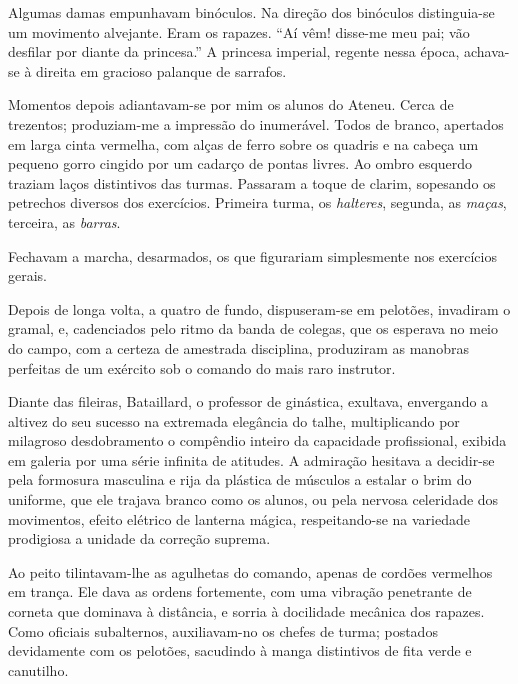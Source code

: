 Algumas damas empunhavam binóculos. Na direção dos binóculos
distinguia{}-se um movimento alvejante. Eram os rapazes. ``Aí vêm!
disse{}-me meu pai; vão desfilar por diante da princesa.'' A princesa
imperial, regente nessa época, achava{}-se à direita em gracioso
palanque de sarrafos. 

Momentos depois adiantavam{}-se por mim os alunos
do Ateneu. Cerca de trezentos; produziam{}-me a impressão do
inumerável. Todos de branco, apertados em larga cinta vermelha, com
alças de ferro sobre os quadris e na cabeça um pequeno gorro cingido
por um cadarço de pontas livres. Ao ombro esquerdo traziam laços
distintivos das turmas. Passaram a toque de clarim, sopesando os
petrechos diversos dos exercícios. Primeira turma, os \textit{halteres},
segunda, as \textit{maças}, terceira, as \textit{barras}. 

Fechavam a marcha, desarmados,
os que figurariam simplesmente nos exercícios gerais. 

Depois de longa volta, a quatro de fundo, dispuseram{}-se em pelotões, invadiram o
gramal, e, cadenciados pelo ritmo da banda de colegas, que os esperava
no meio do campo, com a certeza de amestrada disciplina, produziram as
manobras perfeitas de um exército sob o comando do mais raro instrutor.

Diante das fileiras, Bataillard, o professor de ginástica, exultava,
envergando a altivez do seu sucesso na extremada elegância do talhe,
multiplicando por milagroso desdobramento o compêndio inteiro da
capacidade profissional, exibida em galeria por uma série infinita de
atitudes. A admiração hesitava a decidir{}-se pela formosura masculina
e rija da plástica de músculos a estalar o brim do uniforme, que ele
trajava branco como os alunos, ou pela nervosa celeridade dos
movimentos, efeito elétrico de lanterna mágica, respeitando{}-se na
variedade prodigiosa a unidade da correção suprema. 

Ao peito tilintavam{}-lhe as agulhetas do comando, apenas de cordões vermelhos
em trança. Ele dava as ordens fortemente, com uma vibração penetrante
de corneta que dominava à distância, e sorria à docilidade mecânica dos
rapazes. Como oficiais subalternos, auxiliavam{}-no os chefes de turma;
postados devidamente com os pelotões, sacudindo à manga distintivos de
fita verde e canutilho. 

